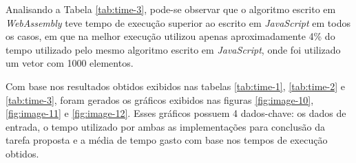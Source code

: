 \begin{table}[ht]
\end{table}

Analisando a Tabela \ref{tab:time-3}, pode-se observar que o algoritmo escrito em
\textit{WebAssembly} teve tempo de execução superior ao escrito em \textit{JavaScript} em
todos os casos, em que na melhor execução utilizou apenas aproximadamente 4\% do tempo
utilizado pelo mesmo algoritmo escrito em \textit{JavaScript}, onde foi utilizado um
vetor com 1000 elementos.

Com base nos resultados obtidos exibidos nas tabelas \ref{tab:time-1}, \ref{tab:time-2} e
\ref{tab:time-3}, foram gerados os gráficos exibidos nas figuras \ref{fig:image-10},
\ref{fig:image-11} e \ref{fig:image-12}. Esses gráficos possuem 4 dados-chave: os dados
de entrada, o tempo utilizado por ambas as implementações para conclusão da tarefa
proposta e a média de tempo gasto com base nos tempos de execução obtidos.


